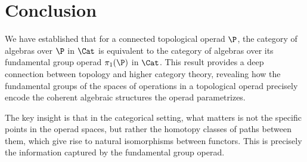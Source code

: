 \section{Conclusion}

We have established that for a connected topological operad $\P$, the category of algebras over $\P$ in $\Cat$ is equivalent to the category of algebras over its fundamental group operad $\pi_1(\P)$ in $\Cat$. This result provides a deep connection between topology and higher category theory, revealing how the fundamental groups of the spaces of operations in a topological operad precisely encode the coherent algebraic structures the operad parametrizes.

The key insight is that in the categorical setting, what matters is not the specific points in the operad spaces, but rather the homotopy classes of paths between them, which give rise to natural isomorphisms between functors. This is precisely the information captured by the fundamental group operad.